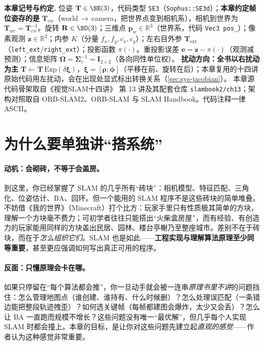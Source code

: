 \begin{note}
\textbf{本章记号与约定.}\;
位姿 $\mathbf{T}\in\SE(3)$，代码类型 \texttt{SE3}（\texttt{Sophus::SE3d}）；\textbf{本章约定帧位姿存的是} $\mathbf{T}_{cw}$（world\,$\to$\,camera，把世界点变到相机系），相机到世界为 $\mathbf{T}_{wc}=\mathbf{T}_{cw}^{-1}$。旋转 $\mathbf{R}\in\SO(3)$；三维点 $\mathbf{p}_w\in\mathbb{R}^3$（世界系，代码 \texttt{Vec3 pos\_}）；像素观测 $\mathbf{z}\in\mathbb{R}^2$；内参 $K$（分量 $f_x,f_y,c_x,c_y$）；左右目外参 $\mathbf{T}_{\mathrm{ext}}$（\texttt{left\_ext}/\texttt{right\_ext}）；投影函数 $\pi(\cdot)$。重投影误差 $\mathbf{e}=\mathbf{z}-\pi(\cdot)$（观测减预测）；信息矩阵 $\boldsymbol\Omega=\boldsymbol\Sigma_v^{-1}=\mathbf{I}_{2\times2}$（各向同性单位权）。
\textbf{扰动方向：全书以右扰动为主} $\mathbf{T}\leftarrow\mathbf{T}\,\mathrm{Exp}(\delta\boldsymbol\xi)$，$\boldsymbol\xi=[\boldsymbol\rho;\boldsymbol\phi]$（平移在前、旋转在后）；本章复用的十四讲原始代码用左扰动，会在出现处显式标出转换关系（\cref{sec:sys-jacobian}）。
本章源代码骨架取自《视觉SLAM十四讲》\cite{gaoxiang2019slam14} 第 13 讲及其配套仓库 \texttt{slambook2/ch13}；架构对照取自 ORB-SLAM2\cite{murartal2017orbslam2}、ORB-SLAM\cite{murartal2015orbslam} 与 SLAM Handbook\cite{carlone2026handbook}。代码注释一律 ASCII。
\end{note}

\section{为什么要单独讲“搭系统”}
\label{sec:sys-why}

\paragraph{动机：会砌砖，不等于会盖房。}
到这里，你已经掌握了 SLAM 的几乎所有“砖块”：相机模型、特征匹配、三角化、位姿估计、BA、回环。但一个能用的 SLAM 程序不是这些砖块的简单堆叠。不妨借《我的世界》（Minecraft）打个比方\cite{gaoxiang2019slam14}：玩家手里只有性质极其简单的方块，理解一个方块毫不费力；可初学者往往只能搭出“火柴盒房屋”，而有经验、有创造力的玩家能用同样的方块盖出民居、园林、楼台亭榭乃至整座城市。差别不在于砖块，而在于\emph{怎么组织它们}。SLAM 也是如此——\textbf{工程实现与理解算法原理至少同等重要}，甚至更应强调如何写出真正可用的程序。

\paragraph{反面：只懂原理会卡在哪。}
如果只停留在“每个算法都会推”，你一旦动手就会被一连串\emph{原理书里不讲}的问题挡住：怎么管理地图点（谁创建、谁持有、什么时候删）？怎么处理误匹配（一条错边能把整段轨迹拽歪）？如何选关键帧（每帧都建图会爆炸，太少又会丢）？怎么让 BA 一直跑而规模不增长？这些问题没有唯一“最优解”，但几乎每个人实现 SLAM 时都会撞上。本章的目标，是让你对这些问题先建立起\emph{直观的感觉}——作者认为这种感觉非常重要。

